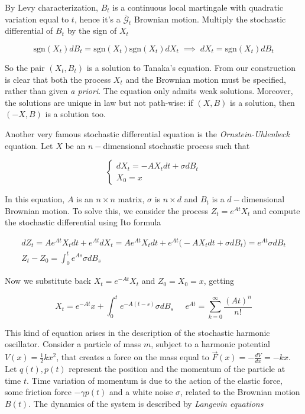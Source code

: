 By Levy characterization, $B_t$ is a continuous local martingale with quadratic variation equal to $t$, hence it's a $\bar{\mathcal{G}}_t$ Brownian motion. Multiply the stochastic differential of $B_t$ by the sign of $X_t$

\begin{equation*}
    \text{sgn}(X_t) dB_t = \text{sgn}(X_t) \text{sgn}(X_t) dX_t \; \implies \; dX_t = \text{sgn}(X_t) dB_t
\end{equation*}

So the pair $(X_t,B_t)$ is a solution to Tanaka's equation. From our construction is clear that both the process $X_t$ and the Brownian motion must be specified, rather than given \textit{a priori}. The equation only admits weak solutions. Moreover, the solutions are unique in law but not path-wise: if $(X,B)$ is a solution, then $(-X,B)$ is a solution too.

Another very famous stochastic differential equation is the \textit{Ornstein-Uhlenbeck} equation. Let $X$ be an $n-$dimensional stochastic process such that

\begin{equation*}
\begin{cases}
    d X_t = -A X_t dt + \sigma dB_t \\
    X_0 = x
\end{cases}
\end{equation*}

In this equation, $A$ is an $n\times n$ matrix, $\sigma$ is $n \times d$ and $B_t$ is a $d-$dimensional Brownian motion. To solve this, we consider the process $Z_t = e^{A t} X_t$ and compute the stochastic differential using Ito formula

\begin{gather*}
    dZ_t = A e^{A t} X_t dt + e^{A t} dX_t = A e^{A t} X_t dt + e^{A t} \big( -A X_t dt + \sigma dB_t \big) = e^{A t} \sigma dB_t \\
    Z_t - Z_0 = \int_0^t e^{As} \sigma dB_s
\end{gather*}

Now we substitute back $X_t = e^{-At}X_t$ and $Z_0 = X_0 = x$, getting 

\begin{equation}
    X_t = e^{-At }x + \int_0^t e^{-A(t-s) }\sigma dB_s \;\;\;\;\; e^{At} = \sum_{k=0}^{\infty} \frac{(A t)^n}{n!}
\end{equation}

This kind of equation arises in the description of the stochastic harmonic oscillator. Consider a particle of mass $m$, subject to a harmonic potential $V(x) = \frac{1}{2}kx^2$, that creates a force on the mass equal to $\vec{F}(x) = -\frac{dV}{dx} = -kx$. Let $q(t),p(t)$ represent the position and the momentum of the particle at time $t$. Time variation of momentum is due to the action of the elastic force, some friction force $-\gamma p(t)$ and a white noise $\sigma$, related to the Brownian motion $B(t)$. The dynamics of the system is described by \textit{Langevin equations}

